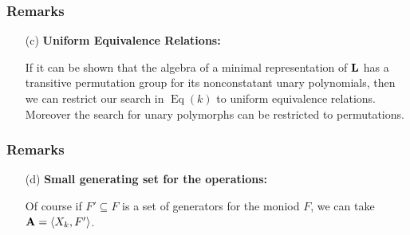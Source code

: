\documentclass[12 pt]{beamer}
\begin{document}
\begin{frame}[t]
\frametitle{Remarks}

\begin{itemize}

\item[(c)]
\textbf{Uniform Equivalence Relations:}

If it can be shown that the algebra of a minimal representation 
of $\mathbf{L}$ has a transitive permutation group for its nonconstatant
unary polynomials, then we can restrict our search in 
$\operatorname{Eq}(k)$ to uniform equivalence relations.
Moreover the search for unary polymorphs can be restricted
to permutations. 

\end{itemize}
\end{frame}


\begin{frame}[t]
\frametitle{Remarks}

\begin{itemize}

\item[(d)]
\textbf{Small generating set for the operations:}

Of course if $F' \subseteq F$ is a set of generators for the 
moniod $F$, we can take $\mathbf{A} = \langle X_k,F' \rangle$.

\end{itemize}


\end{frame}
\end{document}
